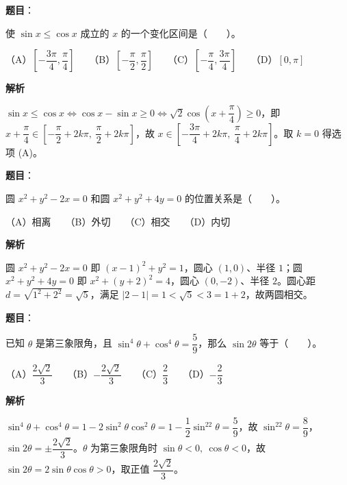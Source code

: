 \begin{answer}

\textbf{题目}：

使 $\sin x\le\cos x$ 成立的 $x$ 的一个变化区间是\mbox{（　　）}。

（A）$\left[-\dfrac{3\pi}{4},\dfrac\pi4\right]$　　（B）$\left[-\dfrac\pi2,\dfrac\pi2\right]$　　（C）$\left[-\dfrac\pi4,\dfrac{3\pi}{4}\right]$　　（D）$[0,\pi]$

\textbf{解析}

$\sin x\le\cos x\iff \cos x-\sin x\ge0\iff \sqrt2\cos\!\left(x+\dfrac\pi4\right)\ge0$，即 $x+\dfrac\pi4\in\left[-\dfrac\pi2+2k\pi,\ \dfrac\pi2+2k\pi\right]$，故 $x\in\left[-\dfrac{3\pi}{4}+2k\pi,\ \dfrac\pi4+2k\pi\right]$。取 $k=0$ 得选项 (A)。


\end{answer}
\begin{answer}

\textbf{题目}：

圆 $x^2+y^2-2x=0$ 和圆 $x^2+y^2+4y=0$ 的位置关系是\mbox{（　　）}。

（A）相离　　（B）外切　　（C）相交　　（D）内切

\textbf{解析}

圆 $x^2+y^2-2x=0$ 即 $(x-1)^2+y^2=1$，圆心 $(1,0)$、半径 $1$；圆 $x^2+y^2+4y=0$ 即 $x^2+(y+2)^2=4$，圆心 $(0,-2)$、半径 $2$。圆心距 $d=\sqrt{1^2+2^2}=\sqrt5$，满足 $|2-1|=1<\sqrt5<3=1+2$，故两圆相交。


\end{answer}
\begin{answer}

\textbf{题目}：

已知 $\theta$ 是第三象限角，且 $\sin^4\theta+\cos^4\theta=\dfrac59$，那么 $\sin2\theta$ 等于\mbox{（　　）}。

（A）$\dfrac{2\sqrt2}{3}$　　（B）$-\dfrac{2\sqrt2}{3}$　　（C）$\dfrac23$　　（D）$-\dfrac23$

\textbf{解析}

$\sin^4\theta+\cos^4\theta=1-2\sin^2\theta\cos^2\theta=1-\dfrac12\sin^22\theta=\dfrac59$，故 $\sin^22\theta=\dfrac89$，$\sin2\theta=\pm\dfrac{2\sqrt2}{3}$。$\theta$ 为第三象限角时 $\sin\theta<0,\ \cos\theta<0$，故 $\sin2\theta=2\sin\theta\cos\theta>0$，取正值 $\dfrac{2\sqrt2}{3}$。


\end{answer}
